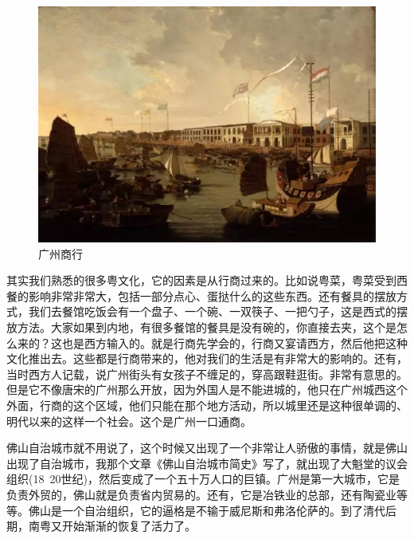\begin{figure}
	\centering
	\includegraphics[width=\textwidth]{images/image-65}
	\caption{广州商行}
\end{figure}

其实我们熟悉的很多粤文化，它的因素是从行商过来的。比如说粤菜，粤菜受到西餐的影响非常非常大，包括一部分点心、蛋挞什么的这些东西。还有餐具的摆放方式，我们去餐馆吃饭会有一个盘子、一个碗、一双筷子、一把勺子，这是西式的摆放方法。大家如果到内地，有很多餐馆的餐具是没有碗的，你直接去夹，这个是怎么来的？这也是西方输入的。就是行商先学会的，行商又宴请西方，然后他把这种文化推出去。这些都是行商带来的，他对我们的生活是有非常大的影响的。还有，当时西方人记载，说广州街头有女孩子不缠足的，穿高跟鞋逛街。非常有意思的。但是它不像唐宋的广州那么开放，因为外国人是不能进城的，他只在广州城西这个外面，行商的这个区域，他们只能在那个地方活动，所以城里还是这种很单调的、明代以来的这样一个社会。这个是广州一口通商。

佛山自治城市就不用说了，这个时候又出现了一个非常让人骄傲的事情，就是佛山出现了自治城市，我那个文章《佛山自治城市简史》写了，就出现了大魁堂的议会组织(18~20世纪)，然后变成了一个五十万人口的巨镇。广州是第一大城市，它是负责外贸的，佛山就是负责省内贸易的。还有，它是冶铁业的总部，还有陶瓷业等等。佛山是一个自治组织，它的逼格是不输于威尼斯和弗洛伦萨的。到了清代后期，南粤又开始渐渐的恢复了活力了。

